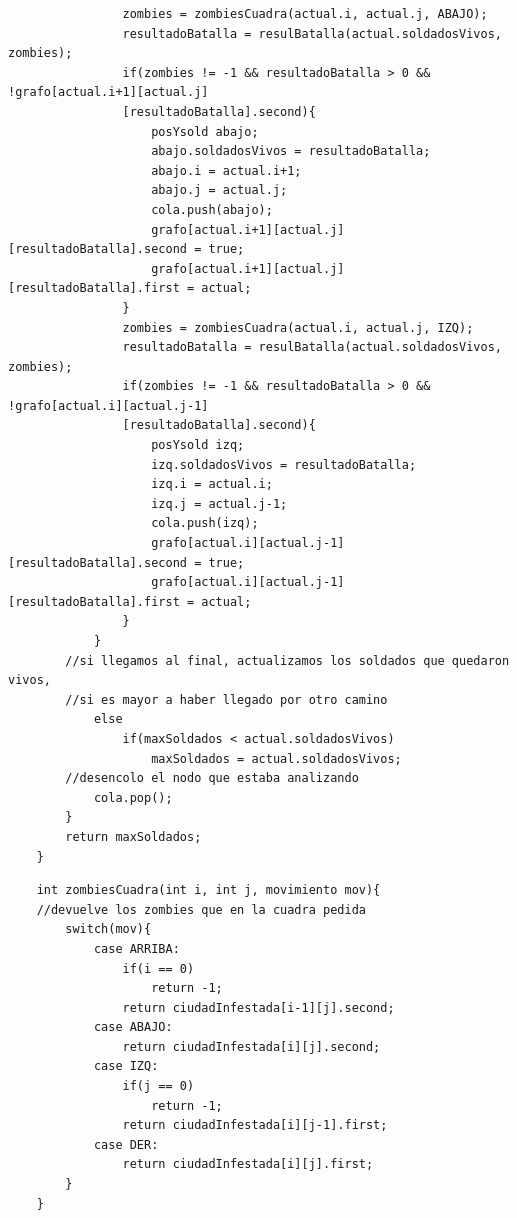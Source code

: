 	\begin{codesnippet}
	\begin{verbatim}
                zombies = zombiesCuadra(actual.i, actual.j, ABAJO);
                resultadoBatalla = resulBatalla(actual.soldadosVivos, zombies);
                if(zombies != -1 && resultadoBatalla > 0 && !grafo[actual.i+1][actual.j]
                [resultadoBatalla].second){
                    posYsold abajo;
                    abajo.soldadosVivos = resultadoBatalla;
                    abajo.i = actual.i+1;
                    abajo.j = actual.j;
                    cola.push(abajo);
                    grafo[actual.i+1][actual.j][resultadoBatalla].second = true;
                    grafo[actual.i+1][actual.j][resultadoBatalla].first = actual;
                }
                zombies = zombiesCuadra(actual.i, actual.j, IZQ);
                resultadoBatalla = resulBatalla(actual.soldadosVivos, zombies);
                if(zombies != -1 && resultadoBatalla > 0 && !grafo[actual.i][actual.j-1]
                [resultadoBatalla].second){
                    posYsold izq;
                    izq.soldadosVivos = resultadoBatalla;
                    izq.i = actual.i;
                    izq.j = actual.j-1;
                    cola.push(izq);
                    grafo[actual.i][actual.j-1][resultadoBatalla].second = true;
                    grafo[actual.i][actual.j-1][resultadoBatalla].first = actual;
                }
            }
        //si llegamos al final, actualizamos los soldados que quedaron vivos, 
        //si es mayor a haber llegado por otro camino
            else
                if(maxSoldados < actual.soldadosVivos)
                    maxSoldados = actual.soldadosVivos;
        //desencolo el nodo que estaba analizando
            cola.pop();
        }
        return maxSoldados;
    }
	\end{verbatim}
	\end{codesnippet}

	\begin{codesnippet}
	\begin{verbatim}
    int zombiesCuadra(int i, int j, movimiento mov){
    //devuelve los zombies que en la cuadra pedida
        switch(mov){
            case ARRIBA:
                if(i == 0)
                    return -1;
                return ciudadInfestada[i-1][j].second;
            case ABAJO:
                return ciudadInfestada[i][j].second;
            case IZQ:
                if(j == 0)
                    return -1;
                return ciudadInfestada[i][j-1].first;
            case DER:
                return ciudadInfestada[i][j].first;
        }
    }
	\end{verbatim}
	\end{codesnippet}

